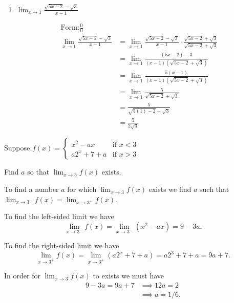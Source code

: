\documentclass[nooutcomes, handout]{ximera}
\begin{document}
\begin{problem}
\begin{enumerate}
	
	\item  $ \lim_{x \to 1} \frac{\sqrt{5x-2} - \sqrt{3}}{x-1} $
	\begin{freeResponse}
	\begin{align*}
	\text{Form:} \frac{0}{0}\\
	\lim_{x \to 1} \frac{\sqrt{5x-2} - \sqrt{3}}{x-1} &= \lim_{x \to 1} \frac{\sqrt{5x-2} - \sqrt{3}}{x-1} \cdot \frac{\sqrt{5x-2} + \sqrt{3}}{\sqrt{5x-2} + \sqrt{3}} \\
	&= \lim_{x \to 1} \frac{(5x-2)-3}{(x-1)(\sqrt{5x-2} + \sqrt{3})} \\
	&= \lim_{x \to 1} \frac{5(x-1)}{(x-1)(\sqrt{5x-2} + \sqrt{3})} \\
	&= \lim_{x \to 1} \frac{5}{\sqrt{5x-2} + \sqrt{3}} \\
	&=   \frac{5}{\sqrt{5(1)-2} + \sqrt{3}} \\
	&= \frac{5}{2 \sqrt{3}} 
	\end{align*}
	\end{freeResponse}
	\end{enumerate}
\end{problem}
	
	
	
	
			
			

\begin{problem}
Suppose
	$f(x) =   \left\{ \begin{array}{lr}
	x^2 - ax 	&	\text{if } x < 3	\\
	a2^x + 7 + a	&	\text{if } x > 3	\end{array} \right.  $
	
	Find $a$ so that $ \lim_{x \to 3} f(x)  $ exists.
	\begin{freeResponse}
	 To find a number $a$ for which $\lim_{x \to 3} f(x)$ exists we find $a$ such that $\lim_{x \to 3^-} f(x) = \lim_{x \to 3^+} f(x)$.

    To find the left-sided limit we have
    \[
      \lim_{x \to 3^-} f(x) = \lim_{x \to 3^-} (x^2 - ax) = 9 - 3a.
    \]
  
    To find the right-sided limit we have
    \[
      \lim_{x \to 3^+} f(x) = \lim_{x \to 3^+} (a2^x + 7 + a) = a2^3 + 7 + a = 9a + 7.
    \]

    In order for $\lim_{x \to 3} f(x)$ to exists we must have
    \begin{align*}
      9 - 3a = 9a + 7 &\implies 12a = 2\\
                      &\implies a = 1/6.
    \end{align*}
	\end{freeResponse}
\end{problem}
	
\end{document}
